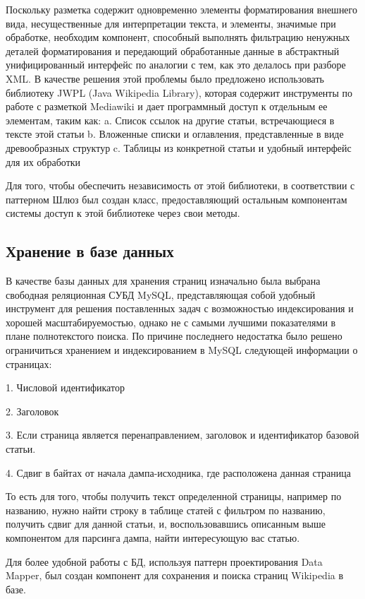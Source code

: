 Поскольку разметка содержит одновременно элементы форматирования внешнего вида,
несущественные для интерпретации текста, и элементы, значимые при обработке,
необходим компонент, способный выполнять фильтрацию ненужных деталей форматирования
и передающий обработанные данные в абстрактный унифицированный интерфейс по аналогии с тем, как это делалось при разборе XML.
В качестве решения этой проблемы было предложено использовать библиотеку 
JWPL (Java Wikipedia Library)\cite{jwpl}, которая содержит инструменты по работе с разметкой 
Mediawiki\cite{wikimarkup} и дает программный доступ к отдельным ее элементам, таким как:
a. Список ссылок на другие статьи, встречающиеся в тексте этой статьи
b. Вложенные списки и оглавления, представленные в виде древообразных структур
c. Таблицы из конкретной статьи и удобный интерфейс для их обработки

Для того, чтобы обеспечить независимость от этой библиотеки, в соответствии
с паттерном Шлюз\cite{patternGateway} был создан класс, предоставляющий остальным компонентам системы
доступ к этой библиотеке через свои методы.

\subsection{Хранение в базе данных}

В качестве базы данных для хранения страниц изначально была выбрана свободная реляционная 
СУБД MySQL\cite{mysql}, представляющая собой удобный инструмент для решения поставленных 
задач с возможностью индексирования и хорошей масштабируемостью, однако не с самыми
лучшими показателями в плане полнотекстого поиска. По причине последнего недостатка было 
решено ограничиться хранением и индексированием в MySQL следующей информации о страницах:

1. Числовой идентификатор

2. Заголовок

3. Если страница является перенаправлением, заголовок и идентификатор  базовой статьи.

4. Сдвиг в байтах от начала дампа-исходника, где расположена данная страница

То есть для того, чтобы получить текст определенной страницы, например по названию,
нужно найти строку в таблице статей с фильтром по названию,
получить сдвиг для данной статьи, и, воспользовавшись
описанным выше компонентом для парсинга дампа, найти интересующую вас статью.

Для более удобной работы с БД, используя паттерн проектирования Data Mapper\cite{patternMapper}, 
был создан компонент для сохранения и поиска страниц Wikipedia в базе.

